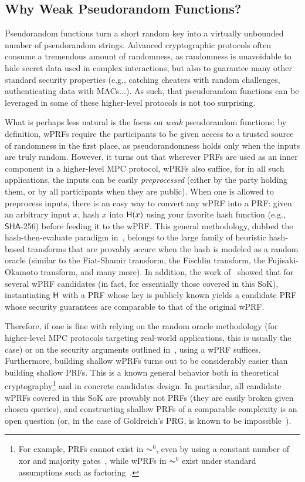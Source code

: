 \subsection{Why Weak Pseudorandom Functions?}

Pseudorandom functions turn a short random key into a virtually unbounded number of pseudorandom strings. Advanced cryptographic protocols often consume a tremendous amount of randomness, as randomness is unavoidable to hide secret data used in complex interactions, but also to guarantee many other standard security properties (e.g., catching cheaters with random challenges, authenticating data with MACs...). As such, that pseudorandom functions can be leveraged in some of these higher-level protocols is not too surprising.

What is perhaps less natural is the focus on \emph{weak} pseudorandom functions: by definition, wPRFs require the participants to be given access to a trusted source of randomness in the first place, as pseudorandomness holds only when the inputs are truly random. However, it turns out that wherever PRFs are used as an inner component in a higher-level MPC protocol, wPRFs also suffice, for in all such applications, the inputs can be easily \emph{preprocessed} (either by the party holding them, or by all participants when they are public). When one is allowed to preprocess inputs, there is an easy way to convert any wPRF into a PRF: given an arbitrary input $x$, hash $x$ into $\mathsf{H}(x)$ using your favorite hash function (e.g., $\mathsf{SHA}$-256) before feeding it to the wPRF. This general methodology, dubbed the hash-then-evaluate paradigm in~\cite{SCN:BCEKM24}, belongs to the large family of heuristic hash-based transforms that are provably secure when the hash is modeled as a random oracle (similar to the Fiat-Shamir transform, the Fischlin transform, the Fujisaki-Okamoto transform, and many more). In addition, the work of~\cite{SCN:BCEKM24} showed that for several wPRF candidates (in fact, for essentially those covered in this SoK), instantiating $\mathsf{H}$ with a PRF whose key is publicly known yields a candidate PRF whose security guarantees are comparable to that of the original wPRF.

Therefore, if one is fine with relying on the random oracle methodology (for higher-level MPC protocols targeting real-world applications, this is usually the case) or on the security arguments outlined in~\cite{SCN:BCEKM24}, using a wPRF suffices. Furthermore, building shallow wPRFs turns out to be considerably easier than building shallow PRFs. This is a known general behavior both in theoretical cryptography\footnote{For example, PRFs cannot exist in $\AC^0$, even by using a constant number of xor and majority gates~\cite{SODA:Viola13}, while wPRFs in $\AC^0$ exist under standard assumptions such as factoring~\cite{STOC:Kharitonov93}.} and in concrete candidates design. In particular, all candidate wPRFs covered in this SoK are provably not PRFs (they are easily broken given chosen queries), and constructing shallow PRFs of a comparable complexity is an open question (or, in the case of Goldreich's PRG, is known to be impossible~\cite{SODA:Viola13,TCC:AppRay16b}).

